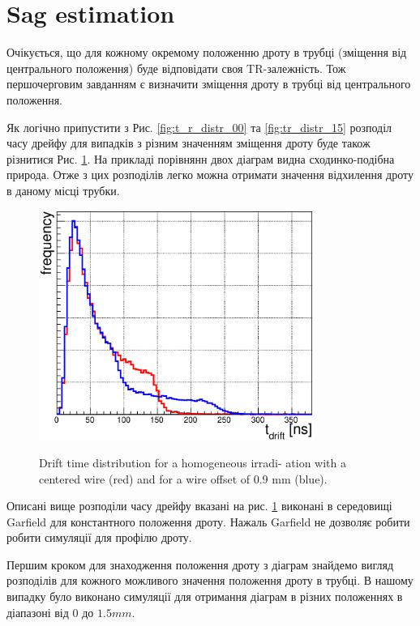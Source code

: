\documentclass[]{article}
\begin{document}
	\section{ Sag estimation}
	
	Очікується, що для кожному окремому положенню дроту в трубці (зміщення від центрального положення) буде відповідати своя TR-залежність. Тож першочерговим завданням є визначити зміщення дроту в  трубці від центрального положення.
	
	Як логічно припустити з Рис. \ref{fig:t_r_distr_00} та \ref{fig:tr_distr_15} розподіл часу дрейфу  для випадків з різним значенням зміщення дроту буде також різнитися Рис. \ref{fig:DrftTimeDistr_00_09_comp}. На прикладі порівнянн  двох діаграм видна сходинко-подібна природа.
	Отже з цих розподілів легко можна отримати значення відхилення дроту в даному місці трубки.
	
	\begin{figure}[h]
	\centering
	\includegraphics[width=0.8\textwidth]{00_09_driftTimeDistr}
	\label{fig:DrftTimeDistr_00_09_comp}
	\caption{Drift time distribution for a homogeneous irradi-
ation with a centered wire (red) and for a wire offset of 0.9 mm (blue).}
	\end{figure}
	
	Описані вище розподіли часу дрейфу вказані на рис. \ref{fig:DrftTimeDistr_00_09_comp} виконані в середовищі Garfield для константного положення дроту. Нажаль Garfield не дозволяє робити робити симуляції для  профілю дроту.

	Першим кроком для знаходження положення дроту з діаграм знайдемо вигляд розподілів для кожного можливого значення положення дроту в трубці. В нашому випадку було виконано симуляції для отримання діаграм в різних положеннях в діапазоні від $0$ до $1.5 mm$.
\end{document}
